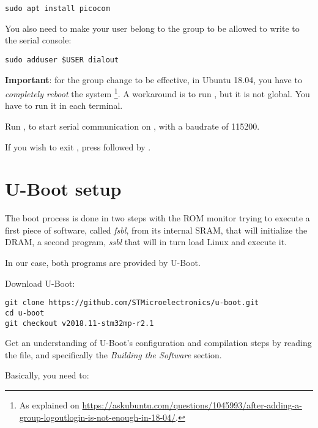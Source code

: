 \begin{verbatim}
sudo apt install picocom
\end{verbatim}

You also need to make your user belong to the  group to be
allowed to write to the serial console:

\begin{verbatim}
sudo adduser $USER dialout
\end{verbatim}

{\bf Important}: for the group change to be effective, in Ubuntu 18.04, you have to
{\em completely reboot} the system \footnote{As explained on
\url{https://askubuntu.com/questions/1045993/after-adding-a-group-logoutlogin-is-not-enough-in-18-04/}.}.
A workaround is to run , but it is not global.
You have to run it in each terminal.

Run , to start serial
communication on , with a baudrate of 115200.

If you wish to exit , press \code{[Ctrl][a]} followed by
\code{[Ctrl][x]}.

\section{U-Boot setup}

The boot process is done in two steps with the ROM monitor trying to
execute a first piece of software, called {\em fsbl}, from its
internal SRAM, that will initialize the DRAM, a second program, {\em
ssbl} that will in turn load Linux and execute it.

In our case, both programs are provided by U-Boot.

Download U-Boot:

\begin{verbatim}
git clone https://github.com/STMicroelectronics/u-boot.git
cd u-boot
git checkout v2018.11-stm32mp-r2.1
\end{verbatim}

Get an understanding of U-Boot's configuration and compilation steps
by reading the  file, and specifically the {\em Building
the Software} section.

Basically, you need to:

